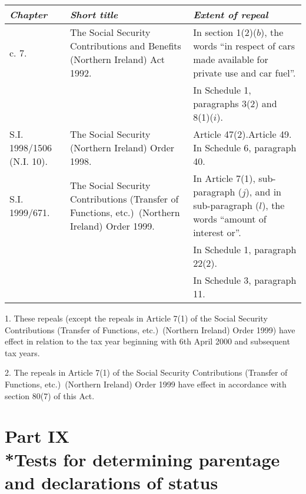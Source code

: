 \documentclass[12pt,a4paper]{article}
\begin{document}
{\footnotesize
\begin{longtable}{p{50pt}p{150.9199pt}p{153.07274pt}}
\hline
\itshape Chapter	&\itshape Short title	&\itshape Extent of repeal\\
\hline
\endhead
\hline
\endlastfoot
1992 c. 7. 	&The Social Security Contributions and Benefits (Northern Ireland) Act 1992. 	&In section 1(2)($b$), the words “in respect of cars made available for private use and car fuel”.\\
&&		In Schedule 1, paragraphs 3(2)  and 8(1)($i$).\\
S.I. 1998/\hspace{0pt}1506 (N.I. 10).	&The Social Security (Northern Ireland) Order 1998. 	&Article 47(2).\newline Article 49. \newline In Schedule 6, paragraph 40. \\
S.I. 1999/\hspace{0pt}671. 	&The Social Security Contributions (Transfer of Functions, etc.)\ (Northern Ireland) Order 1999. 	&In Article 7(1), sub-paragraph ($j$), and in sub-paragraph ($l$), the words “amount of interest or”.\\
&&		In Schedule 1, paragraph 22(2).\\
&&		In Schedule 3, paragraph 11. \\
\end{longtable}

}

1. 
These repeals (except the repeals in Article 7(1)  of the Social Security Contributions (Transfer of Functions, etc.)\ (Northern Ireland) Order 1999) have effect in relation to the tax year beginning with 6th April 2000 and subsequent tax years.

2. 
The repeals in Article 7(1)  of the Social Security Contributions (Transfer of Functions, etc.)\ (Northern Ireland) Order 1999 have effect in accordance with section 80(7)  of this Act.

\section[Part IX --- Tests for determining parentage and declarations of status]{Part IX\\*Tests for determining parentage and declarations of status}
\end{document}

